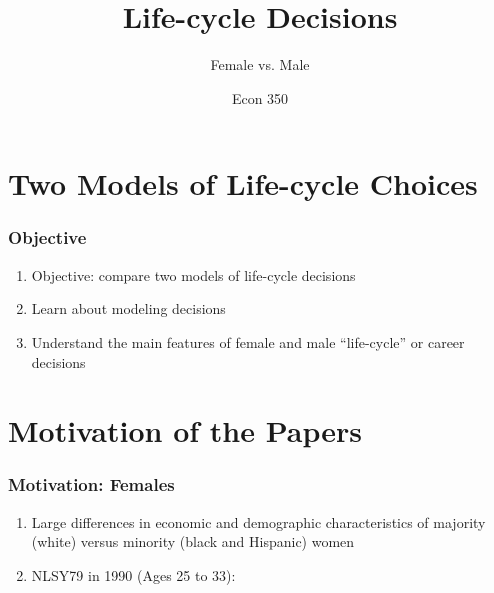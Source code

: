 

\title{Life-cycle Decisions}
\subtitle{Female vs. Male}
\author{Econ 350}



\begin{frame}[plain]
	\titlepage
\end{frame}



\section{Two Models of Life-cycle Choices}

\begin{frame}
	\frametitle{Objective}
		\begin{enumerate}
 			\item Objective: compare two models of life-cycle decisions
 			\item Learn about modeling decisions
 			\item Understand the main features of female and male ``life-cycle'' or career decisions
 		\end{enumerate}
\end{frame}

\section{Motivation of the Papers}
\begin{frame}
	\frametitle{Motivation: Females}
	\begin{enumerate}
		\item Large differences in economic and demographic characteristics of majority (white) versus minority (black and Hispanic) women
		\item NLSY79 in 1990 (Ages 25 to 33):
	\end{enumerate}
\end{frame}

